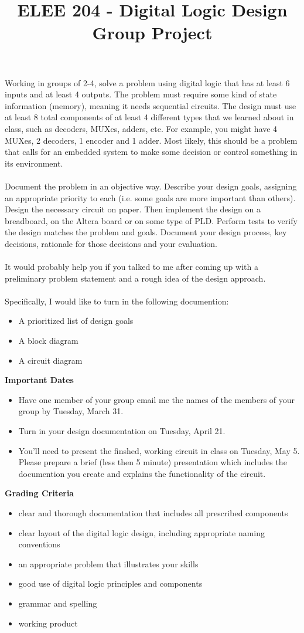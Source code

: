 \documentclass{article}
\title{ELEE 204 - Digital Logic Design\\Group Project}
\date{}
\begin{document}
\maketitle
\thispagestyle{fancy}
Working in groups of 2-4, solve a problem using digital logic that has at least 6 inputs and at least 4 outputs.  The problem must require some kind of state information (memory), meaning it needs sequential circuits.  The design must use at least 8 total components of at least 4 different types that we learned about in class, such as decoders, MUXes, adders, etc.  For example, you might have 4 MUXes, 2 decoders, 1 encoder and 1 adder.  Most likely, this should be a problem that calls for an embedded system to make some decision or control something in its environment.
\\ \\
Document the problem in an objective way.  Describe your design goals, assigning an appropriate priority to each (i.e. some goals are more important than others).  Design the necessary circuit on paper.  Then implement the design on a breadboard, on the Altera board or on some type of PLD.  Perform tests to verify the design matches the problem and goals.  Document your design process, key decisions, rationale for those decisions and your evaluation.
\\ \\
It would probably help you if you talked to me after coming up with a preliminary problem statement and a rough idea of the design approach.
\\ \\
Specifically, I would like to turn in the following documention:
\begin{itemize}
  \item A prioritized list of design goals
  \item A block diagram
  \item A circuit diagram
\end{itemize}
\textbf{Important Dates}
\begin{itemize}
  \item Have one member of your group email me the names of the members of your group by Tuesday, March 31.
  \item Turn in your design documentation on Tuesday, April 21.
  \item You'll need to present the finshed, working circuit in class on Tuesday, May 5.  Please prepare a brief (less then 5 minute) presentation which includes the documention you create and explains the functionality of the circuit.
\end{itemize}
\textbf{Grading Criteria}
\begin{itemize}
  \item clear and thorough documentation that includes all prescribed components
  \item clear layout of the digital logic design, including appropriate naming conventions
  \item an appropriate problem that illustrates your skills
  \item good use of digital logic principles and components
  \item grammar and spelling
  \item working product
\end{itemize}
\end{document}
